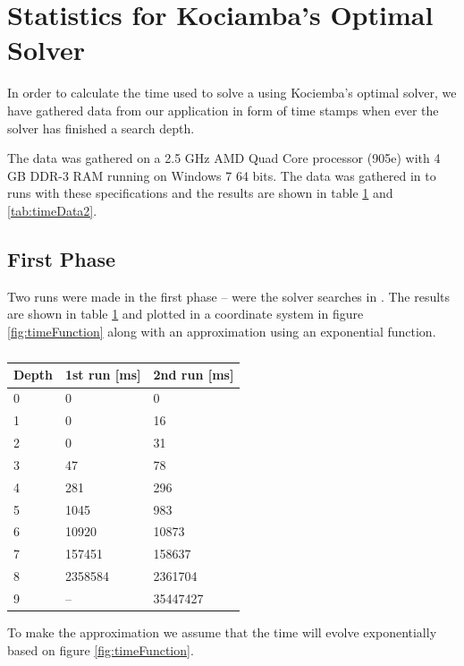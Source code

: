 \section{Statistics for Kociamba's Optimal Solver}
\label{app:kociembaTime}
In order to calculate the time used to solve a \rubik{} using Kociemba's optimal solver, we have gathered data from our application in form of time stamps when ever the solver has finished a search depth.

The data was gathered on a 2.5 GHz AMD Quad Core processor (905e) with 4 GB DDR-3 RAM running on Windows 7 64 bits.
The data was gathered in to runs with these specifications and the results are shown in table \ref{tab:timeData} and \ref{tab:timeData2}.

\subsection{First Phase}
Two runs were made in the first phase -- were the solver searches in .
The results are shown in table \ref{tab:timeData} and plotted in a coordinate system in figure \ref{fig:timeFunction} along with an approximation using an exponential function.
\begin{table}[htb]
\centering
	\begin{tabular}{|l|l|l|}
	\hline
	Depth&1st run [ms]&2nd run [ms]\\
	\hline
	0&0&0\\
	\hline
	1&0&16\\
	\hline
	2&0&31\\
	\hline
	3&47&78\\
	\hline
	4&281&296\\
	\hline
	5&1045&983\\
	\hline
	6&10920&10873\\
	\hline
	7&157451&158637\\
	\hline
	8&2358584&2361704\\
	\hline
	9&--&35447427\\
	\hline
	\end{tabular}
\caption{}
	\label{tab:timeData}
\end{table}

To make the approximation we assume that the time will evolve exponentially based on figure \ref{fig:timeFunction}.

